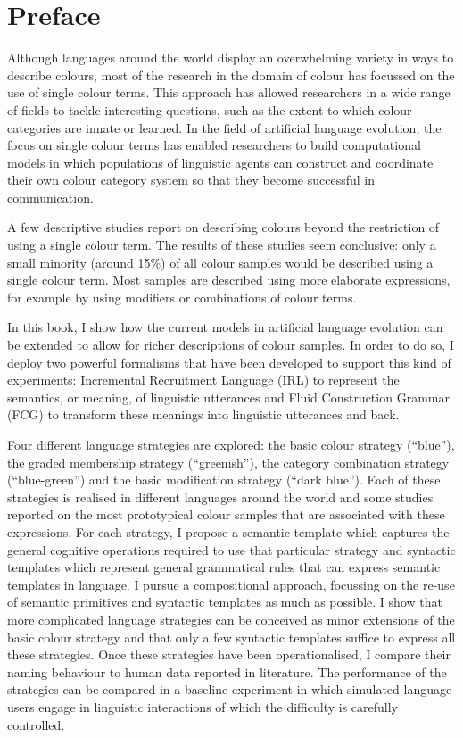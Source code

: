 \chapter*{Preface}

Although languages around the world display an overwhelming variety in
ways to describe colours, most of the research in the domain of colour
has focussed on the use of single colour terms. This approach has
allowed researchers in a wide range of fields to tackle interesting
questions, such as the extent to which colour categories are innate or
learned. In the field of artificial language evolution, the focus on
single colour terms has enabled researchers to build computational
models in which populations of linguistic agents can construct and
coordinate their own colour category system so that they become
successful in communication.

A few descriptive studies report on describing colours beyond the
restriction of using a single colour term. The results of these
studies seem conclusive: only a small minority (around 15\%) of all
colour samples would be described using a single colour term. Most
samples are described using more elaborate expressions, for example by
using modifiers or combinations of colour terms.

In this book, I show how the current models in artificial language
evolution can be extended to allow for richer descriptions of colour
samples. In order to do so, I deploy two powerful formalisms that have
been developed to support this kind of experiments: Incremental
Recruitment Language (IRL) to represent the semantics, or meaning, of
linguistic utterances and Fluid Construction Grammar (FCG) to
transform these meanings into linguistic utterances and back.

Four different language strategies are explored: the basic colour
strategy (``blue''), the graded membership strategy (``greenish''),
the category combination strategy (``blue-green'') and the basic
modification strategy (``dark blue''). Each of these strategies is
realised in different languages around the world and some studies
reported on the most prototypical colour samples that are associated
with these expressions. For each strategy, I propose a semantic
template which captures the general cognitive operations required to
use that particular strategy and syntactic templates which represent
general grammatical rules that can express semantic templates in
language. I pursue a compositional approach, focussing on the re-use
of semantic primitives and syntactic templates as much as possible. I
show that more complicated language strategies can be conceived as
minor extensions of the basic colour strategy and that only a few
syntactic templates suffice to express all these strategies. Once
these strategies have been operationalised, I compare their naming
behaviour to human data reported in literature. The performance of the
strategies can be compared in a baseline experiment in which simulated
language users engage in linguistic interactions of which the
difficulty is carefully controlled.

